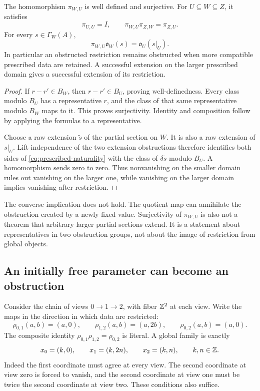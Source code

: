 \begin{theorem}\label{KS59}
The homomorphism \(\pi_{W,U}\) is well defined and surjective. For \(U\subseteq W\subseteq Z\), it satisfies
\[
 \pi_{U,U}=I,\qquad \pi_{W,U}\pi_{Z,W}=\pi_{Z,U}.
\]
For every \(s\in\Gamma_W(A)\),
\begin{equation}\label{eq:prescribed-naturality}
 \pi_{W,U}\mathfrak o_W(s)=\mathfrak o_U(s|_U).
\end{equation}
In particular an obstructed restriction remains obstructed when more compatible prescribed data are retained. A successful extension on the larger prescribed domain gives a successful extension of its restriction.
\end{theorem}
\begin{proof}
If \(r-r'\in B_W\), then \(r-r'\in B_U\), proving well-definedness. Every class modulo \(B_U\) has a representative \(r\), and the class of that same representative modulo \(B_W\) maps to it. This proves surjectivity. Identity and composition follow by applying the formulas to a representative.

Choose a raw extension \(\widetilde s\) of the partial section on \(W\). It is also a raw extension of \(s|_U\). Lift independence of the two extension obstructions therefore identifies both sides of \eqref{eq:prescribed-naturality} with the class of \(\delta\widetilde s\) modulo \(B_U\). A homomorphism sends zero to zero. Thus nonvanishing on the smaller domain rules out vanishing on the larger one, while vanishing on the larger domain implies vanishing after restriction.
\end{proof}
The converse implication does not hold. The quotient map can annihilate the obstruction created by a newly fixed value. Surjectivity of \(\pi_{W,U}\) is also not a theorem that arbitrary larger partial sections extend. It is a statement about representatives in two obstruction groups, not about the image of restriction from global objects.

\subsection{An initially free parameter can become an obstruction}
Consider the chain of views \(0\to1\to2\), with fiber \(\mathbb Z^2\) at each view. Write the maps in the direction in which data are restricted:
\[
 \rho_{0,1}(a,b)=(a,0),\qquad
 \rho_{1,2}(a,b)=(a,2b),\qquad
 \rho_{0,2}(a,b)=(a,0).
\]
The composite identity \(\rho_{0,1}\rho_{1,2}=\rho_{0,2}\) is literal. A global family is exactly
\begin{equation}\label{eq:branch-family}
 x_0=(k,0),\qquad x_1=(k,2n),\qquad x_2=(k,n),
 \qquad k,n\in\mathbb Z.
\end{equation}
Indeed the first coordinate must agree at every view. The second coordinate at view zero is forced to vanish, and the second coordinate at view one must be twice the second coordinate at view two. These conditions also suffice.

